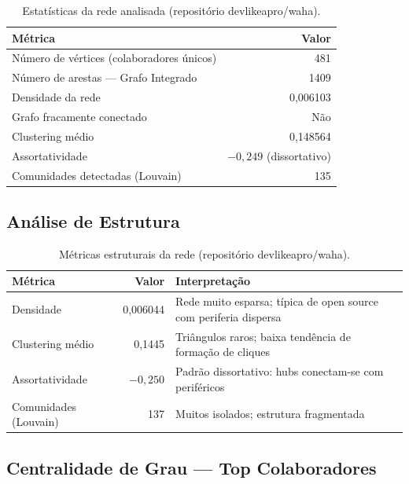 \documentclass[12pt]{article}
\begin{document}
\begin{table}[H]
  \centering
  \caption{Estatísticas da rede analisada (repositório devlikeapro/waha).}
  \label{tab:stats}
  \begin{tabular}{l|r}
    \toprule
    \textbf{Métrica} & \textbf{Valor} \\
    \midrule
    Número de vértices (colaboradores únicos) & 481 \\
    Número de arestas --- Grafo Integrado & 1409 \\
    Densidade da rede & 0,006103 \\
    Grafo fracamente conectado & Não \\
    Clustering médio & 0,148564 \\
    Assortatividade & $-0{,}249$ (dissortativo) \\
    Comunidades detectadas (Louvain) & 135 \\
    \bottomrule
  \end{tabular}
\end{table}

\subsection{Análise de Estrutura}

\begin{table}[H]
  \centering
  \caption{Métricas estruturais da rede (repositório devlikeapro/waha).}
  \label{tab:estrutura}
  \begin{tabular}{l|r|p{6cm}}
    \toprule
    \textbf{Métrica} & \textbf{Valor} & \textbf{Interpretação} \\
    \midrule
    Densidade & 0,006044 & Rede muito esparsa; típica de open source com periferia dispersa \\
    Clustering médio & 0,1445 & Triângulos raros; baixa tendência de formação de cliques \\
    Assortatividade & $-0,250$ & Padrão dissortativo: hubs conectam-se com periféricos \\
    Comunidades (Louvain) & 137 & Muitos isolados; estrutura fragmentada \\
    \bottomrule
  \end{tabular}
\end{table}

\subsection{Centralidade de Grau --- Top Colaboradores}
\end{document}
